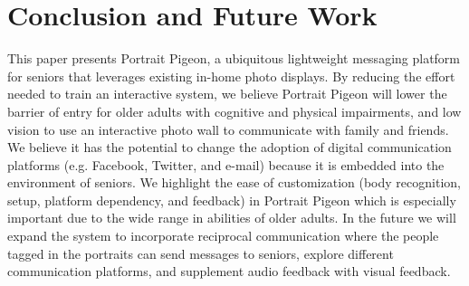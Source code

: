\documentclass{chi-ext}
\begin{document}
\section{Conclusion and Future Work}
This paper presents Portrait Pigeon, a ubiquitous lightweight messaging platform for seniors that leverages existing in-home photo displays. By reducing the effort needed to train an interactive system, we believe Portrait Pigeon will lower the barrier of entry for older adults with cognitive and physical impairments, and low vision to use an interactive photo wall to communicate with family and friends. We believe it has the potential to change the adoption of digital communication platforms (e.g. Facebook, Twitter, and e-mail) because it is embedded into the environment of seniors.  We highlight the ease of customization (body recognition, setup, platform dependency, and feedback) in Portrait Pigeon which is especially important due to the wide range in abilities of older adults. In the future we will expand the system to incorporate reciprocal communication where the people tagged in the portraits can send messages to seniors, explore different communication platforms, and supplement audio feedback with visual feedback.	

\balance


\end{document}
